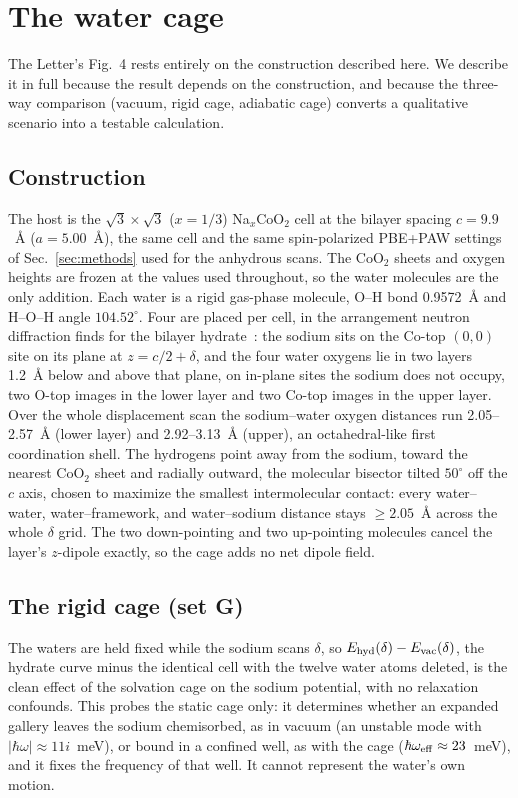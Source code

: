 \documentclass[aps,10pt,preprint,superscriptaddress,floatfix]{revtex4-2}
\begin{document}
\FloatBarrier
\section{The water cage}
\label{sec:water}

The Letter's Fig.~4 rests entirely on the construction described here. We describe it in full
because the result depends on the construction, and because the three-way comparison (vacuum, rigid
cage, adiabatic cage) converts a qualitative scenario into a testable calculation.

\subsection{Construction}

The host is the $\sqrt3\times\sqrt3$ ($x=1/3$) Na$_x$CoO$_2$ cell at the bilayer spacing
$c=9.9$~\AA{} ($a=5.00$~\AA), the same cell and the same spin-polarized PBE+PAW settings of
Sec.~\ref{sec:methods} used for the anhydrous scans. The CoO$_2$ sheets and oxygen heights are
frozen at the values used throughout, so the water molecules are the only addition. Each water is a rigid
gas-phase molecule, O--H bond 0.9572~\AA{} and H--O--H angle $104.52^\circ$. Four are placed per
cell, in the arrangement neutron diffraction finds for the bilayer
hydrate~\cite{Jorgensen2003,Lynn2003}: the sodium sits on the Co-top $(0,0)$ site on its plane at
$z=c/2+\delta$, and the four water oxygens lie in two layers 1.2~\AA{} below and above that plane,
on in-plane sites the sodium does not occupy, two O-top images in the lower layer and two Co-top
images in the upper layer. Over the whole displacement scan the sodium--water oxygen distances run
2.05--2.57~\AA{} (lower layer) and 2.92--3.13~\AA{} (upper), an octahedral-like first coordination
shell. The hydrogens point away from the sodium, toward the nearest CoO$_2$ sheet and radially
outward, the molecular bisector tilted $50^\circ$ off the $c$ axis, chosen to maximize the smallest
intermolecular contact: every water--water, water--framework, and water--sodium distance stays
$\geq2.05$~\AA{} across the whole $\delta$ grid. The two down-pointing and two up-pointing molecules
cancel the layer's $z$-dipole exactly, so the cage adds no net dipole field.

\subsection{The rigid cage (set G)}

The waters are held fixed while the sodium scans $\delta$, so $E_{\rm hyd}(\delta)-E_{\rm
vac}(\delta)$, the hydrate curve minus the identical cell with the twelve water atoms deleted, is
the clean effect of the solvation cage on the sodium potential, with no relaxation confounds. This
probes the static cage only: it determines whether an expanded gallery leaves the sodium
chemisorbed, as in vacuum (an unstable mode with $\lvert\hbar\omega\rvert\approx11i$~meV), or bound
in a confined well, as with the cage ($\hbar\omega_{\rm eff}\approx23$~meV), and it fixes the
frequency of that well. It cannot represent the water's own motion.
\end{document}
